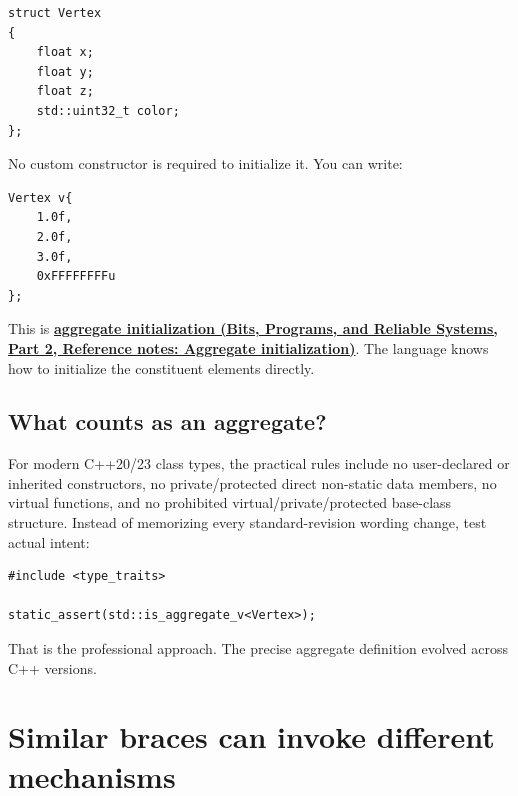 \begin{verbatim}
struct Vertex
{
    float x;
    float y;
    float z;
    std::uint32_t color;
};
\end{verbatim}

No custom constructor is required to initialize it. You can write:

\begin{verbatim}
Vertex v{
    1.0f,
    2.0f,
    3.0f,
    0xFFFFFFFFu
};
\end{verbatim}

This is \textbf{\href{../01-Bits-Programs-and-Reliable-Systems-P02/main.pdf\#nameddest=appendix-b7174c179542}{aggregate initialization (Bits, Programs, and Reliable Systems, Part 2, Reference notes: Aggregate initialization)}}. The language knows how to initialize the constituent elements directly.

\subsection{What counts as an aggregate?}\label{05-engine-i-ch003-what-counts-as-an-aggregate}

\hypertarget{05-engine-i-ch003-what-counts-as-an-aggregate}{}

For modern C++20/23 class types, the practical rules include no user-declared or inherited constructors, no private/protected direct non-static data members, no virtual functions, and no prohibited virtual/private/protected base-class structure. Instead of memorizing every standard-revision wording change, test actual intent:

\begin{verbatim}
#include <type_traits>

static_assert(std::is_aggregate_v<Vertex>);
\end{verbatim}

That is the professional approach. The precise aggregate definition evolved across C++ versions.

\section{Similar braces can invoke different mechanisms}\label{05-engine-i-ch003-similar-braces-can-invoke-different-mechanisms}

\hypertarget{05-engine-i-ch003-similar-braces-can-invoke-different-mechanisms}{}

